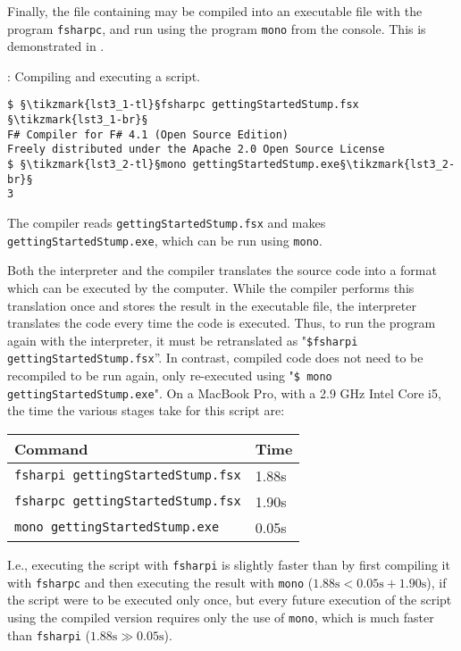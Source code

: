 \documentclass[fsharpnotes.tex]{subfiles}
\begin{document}
Finally, the file containing  may be compiled into an executable file with the program \lstinline[language=console]{fsharpc}, and run using the program \lstinline[language=console]{mono} from the console. This is demonstrated in .
%
\begin{codeNOutput}[label=compiler]{: Compiling and executing a script.}
\begin{lstlisting}[language=console,escapechar=§]
$ §\tikzmark{lst3_1-tl}§fsharpc gettingStartedStump.fsx §\tikzmark{lst3_1-br}§
F# Compiler for F# 4.1 (Open Source Edition)
Freely distributed under the Apache 2.0 Open Source License
$ §\tikzmark{lst3_2-tl}§mono gettingStartedStump.exe§\tikzmark{lst3_2-br}§
3
\end{lstlisting}
\end{codeNOutput}
%
%
%
The compiler reads \lstinline[language=console]{gettingStartedStump.fsx} and makes \lstinline[language=console]{gettingStartedStump.exe}, which can be run using \lstinline[language=console]{mono}.

Both the interpreter and the compiler translates the source code into a format which can be executed by the computer. While the compiler performs this translation once and stores the result in the executable file, the interpreter translates the code every time the code is executed. Thus, to run the program again with the interpreter, it must be retranslated as "\lstinline[language=console]{$fsharpi gettingStartedStump.fsx}''. %
In contrast, compiled code does not need to be recompiled to be run again, only re-executed using "\lstinline[language=console]{$ mono gettingStartedStump.exe}". %
On a MacBook Pro, with a 2.9 GHz Intel Core i5, the time the various stages take for this script are:
\begin{center}
  \begin{tabular}{|l|l|}
    \hline
    \rowcolor{headerRowColor} Command & Time\\
    \hline
    \lstinline[language=console]|fsharpi gettingStartedStump.fsx| & 1.88s\\
    \lstinline[language=console]|fsharpc gettingStartedStump.fsx| & 1.90s\\
    \lstinline[language=console]|mono gettingStartedStump.exe| & 0.05s\\
    \hline
\end{tabular}
\end{center}
I.e., executing the script with \lstinline[language=console]|fsharpi| is slightly faster than by first compiling it with \lstinline[language=console]|fsharpc| and then executing the result with \lstinline[language=console]|mono| ($1.88\text{s} < 0.05\text{s}+1.90\text{s}$), if the script were to be executed only once, but every future execution of the script using the compiled version requires only the use of \lstinline[language=console]|mono|, which is much faster than \lstinline[language=console]|fsharpi| ($1.88\text{s}\gg 0.05\text{s}$).
\end{document}
